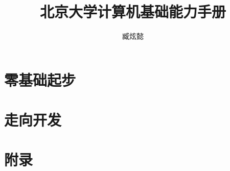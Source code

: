 \documentclass[openany]{ctexbook}
\title{\Huge\textbf{北京大学计算机基础能力手册}}
\author[1]{臧炫懿}
\affil[1]{北京大学学生Linux俱乐部}
\affil[ ]{\faGithub\ \texttt{ZangXuanyi/getting-started-handout}}
\affil[ ]{\faEnvelope\ \texttt{zangxuanyi@stu.pku.edu.cn}}
\date{}
\begin{document}
\maketitle

\frontmatter



\mainmatter

  \tableofcontents

\part{零基础起步}





% 








% 



\part{走向开发}







% 

\part{附录}

\appendix











\backmatter


\end{document}
